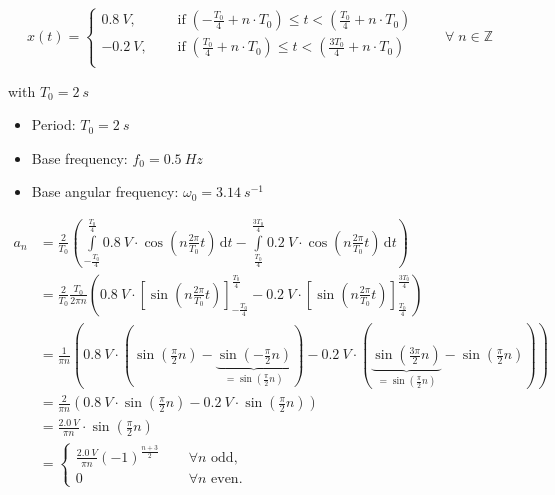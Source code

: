 \begin{solution}
	\begin{tasks}
		\task
		\begin{equation*}
			x(t) = \begin{cases}
				\SI{0.8}{V}, &\quad \text{ if} \; \left(-\frac{T_0}{4} + n \cdot T_0\right) \leq t < \left(\frac{T_0}{4} + n \cdot T_0\right) \\
				\SI{-0.2}{V}, &\quad \text{ if} \; \left(\frac{T_0}{4} + n \cdot T_0\right) \leq t < \left(\frac{3T_0}{4} + n \cdot T_0\right) \\
			\end{cases} \qquad \forall \; n \in \mathbb{Z}
		\end{equation*}
		
		with $T_0 = \SI{2}{s}$
		
		\task
		\begin{itemize}
			\item Period: $T_0 = \SI{2}{s}$
			\item Base frequency: $f_0 = \SI{0,5}{Hz}$
			\item Base angular frequency: $\omega_0 = \SI{3.14}{s^{-1}}$
		\end{itemize}
	
		\task
		\begin{equation*}
			\begin{split}
				a_n &= \frac{2}{T_0} \left( \int\limits_{-\frac{T_0}{4}}^{\frac{T_0}{4}} \SI{0.8}{V} \cdot \cos\left(n\frac{2\pi}{T_0}t\right) \, \mathrm{d} t - \int\limits_{\frac{T_0}{4}}^{\frac{3T_0}{4}} \SI{0.2}{V} \cdot \cos\left(n\frac{2\pi}{T_0}t\right) \, \mathrm{d} t \right) \\
				 &= \frac{2}{T_0} \frac{T_0}{2 \pi n} \left( \SI{0.8}{V} \cdot \left[\sin\left(n\frac{2\pi}{T_0}t\right)\right]_{-\frac{T_0}{4}}^{\frac{T_0}{4}} - \SI{0.2}{V} \cdot \left[\sin\left(n\frac{2\pi}{T_0}t\right)\right]_{\frac{T_0}{4}}^{\frac{3T_0}{4}} \right) \\
				 &= \frac{1}{\pi n} \left(
				 	\SI{0.8}{V} \cdot \left(
				 		\sin\left(\frac{\pi}{2}n\right)
				 		- \underbrace{\sin\left(-\frac{\pi}{2}n\right)}_{= \sin\left(\frac{\pi}{2}n\right)}
				 	\right)
				 	- \SI{0.2}{V} \cdot \left(
				 		\underbrace{\sin\left(\frac{3\pi}{2}n\right)}_{= \sin\left(\frac{\pi}{2}n\right)}
				 		- \sin\left(\frac{\pi}{2}n\right)
				 	\right)
				 \right) \\
				 &= \frac{2}{\pi n} \left( \SI{0.8}{V} \cdot \sin\left(\frac{\pi}{2}n\right) - \SI{0.2}{V} \cdot \sin\left(\frac{\pi}{2}n\right) \right) \\
				 &= \frac{\SI{2,0}{V}}{\pi n} \cdot \sin\left(\frac{\pi}{2}n\right) \\
				 &= \begin{cases}
				 	\frac{\SI{2,0}{V}}{\pi n} (-1)^{\frac{n+3}{2}} &\quad \; \forall n \text{ odd}, \\
				 	0 &\quad \; \forall n \text{ even}.
				 \end{cases}
			\end{split}
		\end{equation*}
		

\end{tasks}
\end{solution}
